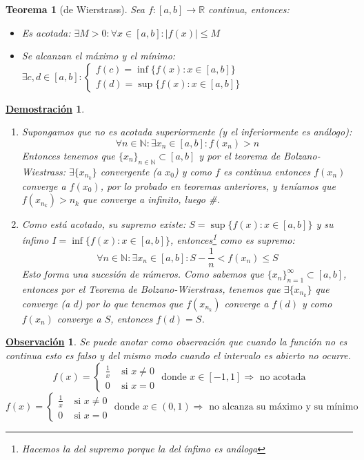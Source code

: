 \documentclass[10pt,a4paper,openright]{book}
\theoremstyle{break}
\newtheorem{theo}{Teorema}[chapter]
\newtheorem*{demo}{\underline{Demostración}}
\newtheorem{obs}{\underline{Observación}}[chapter]
\begin{document}
\begin{theo}[de Wierstrass]
Sea $f:[a,b] \rightarrow \mathbb R$ continua, entonces:
\begin{itemize}
\item Es acotada: $\exists M>0: \forall x\in [a,b]: |f(x)|\leq M$

\item Se alcanzan el máximo y el mínimo: $\exists c,d\in [a,b]: \begin{cases} f(c)=\inf\{f(x): x\in [a,b]\} \\ f(d)=\sup\{f(x): x\in [a,b]\}\end{cases}$
\end{itemize}
\end{theo}
\begin{demo}
\begin{enumerate}
\item Supongamos que no es acotada superiormente (y el inferiormente es análogo):
$$\forall n\in \mathbb N: \exists x_n\in [a,b]: f(x_n)>n$$
Entonces tenemos que $\{x_n\}_{n\in \mathbb N}\subset [a,b]$ y por el teorema de Bolzano-Wiestrass: $\exists \{x_{n_k}\}$ convergente (a $x_0$) y como $f$ es continua entonces $f(x_n)$ converge a $f(x_0)$, por lo probado en teoremas anteriores, y teníamos que $f(x_{n_k})>n_k$ que converge a infinito, luego \#.

\item Como está acotado, su supremo existe: $S=\sup\{f(x): x\in [a,b]\}$ y su ínfimo $I=\inf\{f(x): x\in [a,b]\}$, entonces\footnote{Hacemos la del supremo porque la del ínfimo es análoga} como es supremo:
$$\forall n\in \mathbb N: \exists x_n\in [a,b]: S-\frac{1}{n}<f(x_n)\leq S$$
Esto forma una sucesión de números. Como sabemos que $\{x_n\}_{n=1}^\infty\subset[a,b]$, entonces por el Teorema de Bolzano-Wierstrass, tenemos que $\exists \{x_{n_k}\}$ que converge (a $d$) por lo que tenemos que $f(x_{n_k})$ converge a $f(d)$ y como $f(x_n)$ converge a $S$, entonces $f(d)=S$.
\end{enumerate}
\end{demo}

\begin{obs}
Se puede anotar como observación que cuando la función no es continua esto es falso y del mismo modo cuando el intervalo es abierto no ocurre.
$$f(x)=\begin{cases} \frac{1}{x} & \mbox{ si }x\neq 0 \\ 0 &\mbox{ si }x=0\end{cases} \mbox{ donde }x\in [-1,1]\Rightarrow \mbox{ no acotada}$$
$$f(x)=\begin{cases} \frac{1}{x} & \mbox{ si }x\neq 0 \\ 0 &\mbox{ si }x=0\end{cases} \mbox{ donde }x\in (0,1)\Rightarrow \mbox{ no alcanza su máximo y su mínimo}$$
\end{obs}
\end{document}
